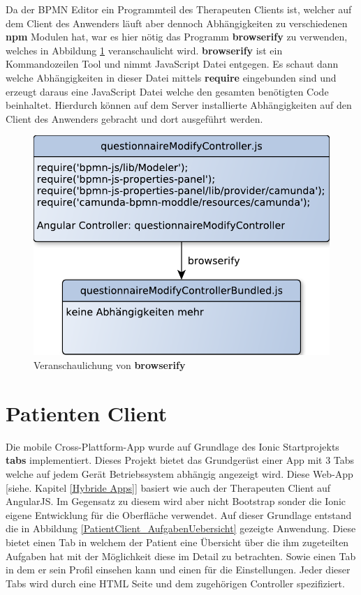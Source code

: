 Da der BPMN Editor ein Programmteil des Therapeuten Clients ist, welcher auf dem Client des Anwenders läuft aber dennoch Abhängigkeiten zu verschiedenen \textbf{npm} Modulen hat, war es hier nötig das Programm \textbf{browserify} zu verwenden, welches in Abbildung \ref{browserifyErlauterung} veranschaulicht wird. \textbf{browserify} ist ein Kommandozeilen Tool und nimmt JavaScript Datei entgegen. Es schaut dann welche Abhängigkeiten in dieser Datei mittels \textbf{require} eingebunden sind und erzeugt daraus eine JavaScript Datei welche den gesamten benötigten Code beinhaltet. Hierdurch können auf dem Server installierte Abhängigkeiten auf den Client des Anwenders gebracht und dort ausgeführt werden. 

\begin{figure}[H]
	\centering
	\includegraphics[scale=0.7]{images/browserifyErlauterung}
	\caption[Veranschaulichung von \textbf{browserify}]{Veranschaulichung von \textbf{browserify}}
	\label{browserifyErlauterung}
\end{figure}

\section{Patienten Client}\label{_ImpPatientClient}
Die mobile Cross-Plattform-App wurde auf Grundlage des Ionic Startprojekts \textbf{tabs} implementiert. Dieses Projekt bietet das Grundgerüst einer App mit 3 Tabs welche auf jedem Gerät Betriebssystem abhängig angezeigt wird. Diese Web-App [siehe. Kapitel \ref{Hybride Apps}] basiert wie auch der Therapeuten Client auf AngularJS. Im Gegensatz zu diesem wird aber nicht Bootstrap sonder die Ionic eigene Entwicklung für die Oberfläche verwendet. Auf dieser Grundlage entstand die in Abbildung \ref{PatientClient_AufgabenUebersicht} gezeigte Anwendung. Diese bietet einen Tab in welchem der Patient eine Übersicht über die ihm zugeteilten Aufgaben hat mit der Möglichkeit diese im Detail zu betrachten. Sowie einen Tab in dem er sein Profil einsehen kann und einen für die Einstellungen. Jeder dieser Tabs wird durch eine HTML Seite und dem zugehörigen Controller spezifiziert. 

